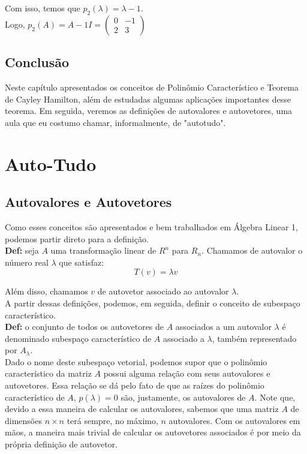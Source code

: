 \documentclass[12pt]{article}
\begin{document}
Com isso, temos que $p_2(\lambda)=\lambda-1$.\\

Logo,  $p_2(A)=A-1I=\begin{pmatrix}
	0 & -1 \\
	2 & 3
\end{pmatrix}
$

\subsection{Conclusão}
Neste capítulo apresentados os conceitos de  Polinômio Característico e Teorema de Cayley Hamilton, além de estudadas algumas aplicações importantes desse teorema. Em seguida, veremos as definições de autovalores e autovetores, uma aula que eu costumo chamar, informalmente, de "autotudo".

\section{Auto-Tudo}

\subsection{Autovalores e Autovetores}

Como esses conceitos são apresentados e bem trabalhados em Álgebra Linear 1, podemos partir direto para a definição.\\

\textbf{Def:} seja $A$ uma transformação linear de $R^n$ para $R_n$. Chamamos de autovalor o número real $\lambda$ que satisfaz:
\begin{equation*}
	T(v)=\lambda v
\end{equation*}

Além disso, chamamos $v$ de autovetor associado ao autovalor $\lambda$.\\

A partir dessas definições, podemos, em seguida, definir o conceito de subespaço característico.\\

\textbf{Def:} o conjunto de todos os autovetores de $A$ associados a um autovalor $\lambda$ é denominado subespaço característico de $A$ associado a $\lambda$, também representado por $A_{\lambda}$.\\

Dado o nome deste subespaço vetorial, podemos supor que o polinômio característico da matriz $A$ possui alguma relação com seus autovalores e autovetores. Essa relação se dá pelo fato de que as raízes do polinômio característico de $A$, $p(\lambda)=0$ são, justamente, os autovalores de $A$. Note que, devido a essa maneira de calcular os autovalores, sabemos que uma matriz $A$ de dimensões $n\times n$ terá sempre, no máximo, $n$ autovalores. Com os autovalores em mãos, a maneira mais trivial de calcular os autovetores associados é por meio da própria definição de autovetor.
\end{document}
